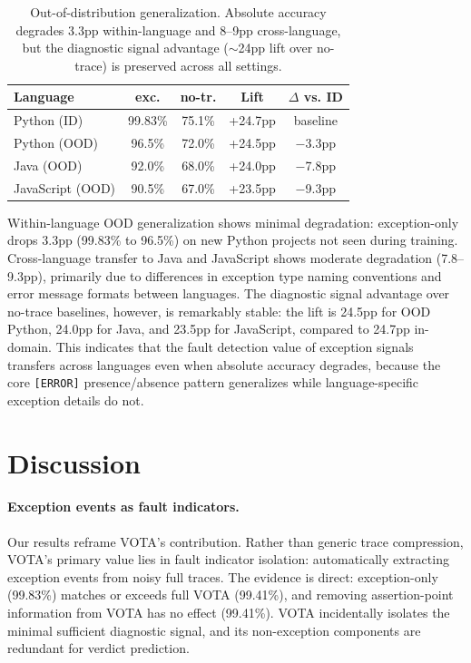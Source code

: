 \documentclass[11pt,a4paper]{article}
\begin{document}
\begin{table}[t]
\centering
\small
\begin{tabular}{lcccc}
\toprule
\textbf{Language} & \textbf{exc.} & \textbf{no-tr.} & \textbf{Lift} & \textbf{$\Delta$ vs. ID} \\
\midrule
Python (ID) & 99.83\% & 75.1\% & +24.7pp & baseline \\
Python (OOD) & 96.5\% & 72.0\% & +24.5pp & $-$3.3pp \\
Java (OOD) & 92.0\% & 68.0\% & +24.0pp & $-$7.8pp \\
JavaScript (OOD) & 90.5\% & 67.0\% & +23.5pp & $-$9.3pp \\
\bottomrule
\end{tabular}
\caption{Out-of-distribution generalization. Absolute accuracy degrades 3.3pp within-language and 8--9pp cross-language, but the diagnostic signal advantage ($\sim$24pp lift over no-trace) is preserved across all settings.}
\label{tab:ood}
\end{table}

Within-language OOD generalization shows minimal degradation: exception-only drops 3.3pp (99.83\% to 96.5\%) on new Python projects not seen during training. Cross-language transfer to Java and JavaScript shows moderate degradation (7.8--9.3pp), primarily due to differences in exception type naming conventions and error message formats between languages. The diagnostic signal advantage over no-trace baselines, however, is remarkably stable: the lift is 24.5pp for OOD Python, 24.0pp for Java, and 23.5pp for JavaScript, compared to 24.7pp in-domain. This indicates that the fault detection value of exception signals transfers across languages even when absolute accuracy degrades, because the core \texttt{[ERROR]} presence/absence pattern generalizes while language-specific exception details do not.

\section{Discussion}

\paragraph{Exception events as fault indicators.}
Our results reframe VOTA's contribution. Rather than generic trace compression, VOTA's primary value lies in fault indicator isolation: automatically extracting exception events from noisy full traces. The evidence is direct: exception-only (99.83\%) matches or exceeds full VOTA (99.41\%), and removing assertion-point information from VOTA has no effect (99.41\%). VOTA incidentally isolates the minimal sufficient diagnostic signal, and its non-exception components are redundant for verdict prediction.
\end{document}
